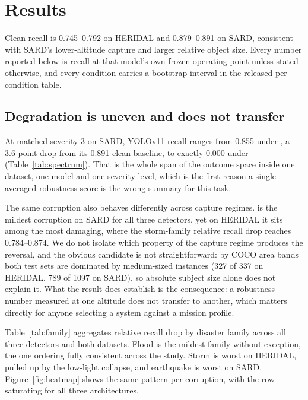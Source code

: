 \section{Results}
\label{sec:results}

Clean recall is 0.745--0.792 on HERIDAL and 0.879--0.891 on SARD,
consistent with SARD's lower-altitude capture and larger relative object
size. Every number reported below is recall at that model's own frozen
operating point unless stated otherwise, and every condition carries a
bootstrap interval in the released per-condition table.

\subsection{Degradation is uneven and does not transfer}

At matched severity 3 on SARD, YOLOv11 recall ranges from 0.855 under
, a 3.6-point drop from its 0.891 clean baseline, to
exactly 0.000 under  (Table~\ref{tab:spectrum}). That is
the whole span of the outcome space inside one dataset, one model and
one severity level, which is the first reason a single averaged
robustness score is the wrong summary for this task.

The same corruption also behaves differently across capture regimes.
 is the mildest corruption on SARD for all three
detectors, yet on HERIDAL it sits among the most damaging, where the
storm-family relative recall drop reaches 0.784--0.874. We do not
isolate which property of the capture regime produces the reversal, and
the obvious candidate is not straightforward: by COCO area bands both
test sets are dominated by medium-sized instances (327 of 337 on
HERIDAL, 789 of 1097 on SARD), so absolute subject size alone does not
explain it. What the result does establish is the consequence: a
robustness number measured at one altitude does not transfer to another,
which matters directly for anyone selecting a system against a mission
profile.

Table~\ref{tab:family} aggregates relative recall drop by disaster
family across all three detectors and both datasets. Flood is the
mildest family without exception, the one ordering fully consistent
across the study. Storm is worst on HERIDAL, pulled up by the low-light
collapse, and earthquake is worst on SARD. Figure~\ref{fig:heatmap}
shows the same pattern per corruption, with the  row
saturating for all three architectures.

